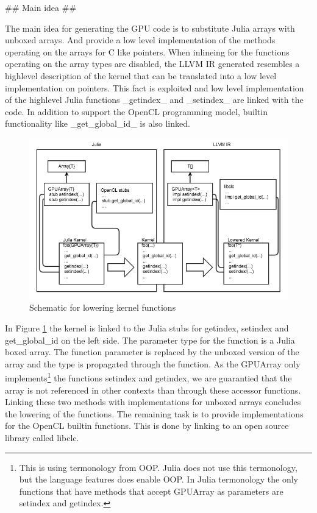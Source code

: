 \begin{markdown}
## Main idea ##

The main idea for generating the GPU code is to substitute Julia
arrays with unboxed arrays. And provide a low level implementation of
the methods operating on the arrays for C like pointers. When
inlineing for the functions operating on the array types are disabled,
the LLVM IR generated resembles a highlevel description of the kernel
that can be translated into a low level implementation on
pointers. This fact is exploited and low level implementation of the
highlevel Julia functions _getindex_ and _setindex_ are linked with
the code. In addition to support the OpenCL programming model, builtin
functionality like _get_global_id_ is also linked.

\begin{figure}[H]
  \centering
  \includegraphics[width=1\textwidth]{body/figures/lowering_schematic.png}
  \caption{Schematic for lowering kernel functions}
  \label{fig:lowering}
\end{figure}

In Figure \ref{fig:lowering} the kernel is linked to the Julia stubs
for getindex, setindex and get_global_id on the left side. The
parameter type for the function is a Julia boxed array. The function
parameter is replaced by the unboxed version of the array and the type
is propagated through the function. As the GPUArray only
implements\footnote{This is using termonology from OOP. Julia does not
  use this termonology, but the language features does enable OOP. In
  Julia termonology the only functions that have methods that accept
  GPUArray as parameters are setindex and getindex.} the functions
setindex and getindex, we are guarantied that the array is not
referenced in other contexts than through these accessor functions.
Linking these two methods with implementations for unboxed arrays
concludes the lowering of the functions. The remaining task is to
provide implementations for the OpenCL builtin functions. This is done
by linking to an open source library called libclc.

  
\end{markdown}
